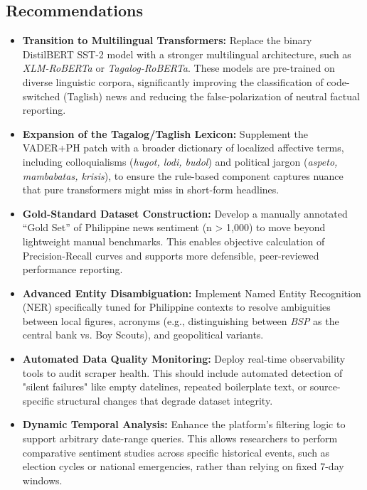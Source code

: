 \documentclass[sigconf, nonacm]{acmart}
\begin{document}
\subsection{Recommendations}
\begin{itemize}
    \item \textbf{Transition to Multilingual Transformers:} Replace the binary DistilBERT SST-2 model with a stronger multilingual architecture, such as \textit{XLM-RoBERTa} or \textit{Tagalog-RoBERTa}. These models are pre-trained on diverse linguistic corpora, significantly improving the classification of code-switched (Taglish) news and reducing the false-polarization of neutral factual reporting.
    
    \item \textbf{Expansion of the Tagalog/Taglish Lexicon:} Supplement the VADER+PH patch with a broader dictionary of localized affective terms, including colloquialisms (\textit{hugot, lodi, budol}) and political jargon (\textit{aspeto, mambabatas, krisis}), to ensure the rule-based component captures nuance that pure transformers might miss in short-form headlines.
    
    \item \textbf{Gold-Standard Dataset Construction:} Develop a manually annotated ``Gold Set'' of Philippine news sentiment (n > 1,000) to move beyond lightweight manual benchmarks. This enables objective calculation of Precision-Recall curves and supports more defensible, peer-reviewed performance reporting.
    
    \item \textbf{Advanced Entity Disambiguation:} Implement Named Entity Recognition (NER) specifically tuned for Philippine contexts to resolve ambiguities between local figures, acronyms (e.g., distinguishing between \textit{BSP} as the central bank vs. Boy Scouts), and geopolitical variants.
    
    \item \textbf{Automated Data Quality Monitoring:} Deploy real-time observability tools to audit scraper health. This should include automated detection of "silent failures" like empty datelines, repeated boilerplate text, or source-specific structural changes that degrade dataset integrity.
    
    \item \textbf{Dynamic Temporal Analysis:} Enhance the platform's filtering logic to support arbitrary date-range queries. This allows researchers to perform comparative sentiment studies across specific historical events, such as election cycles or national emergencies, rather than relying on fixed 7-day windows.
\end{itemize}
\end{document}
